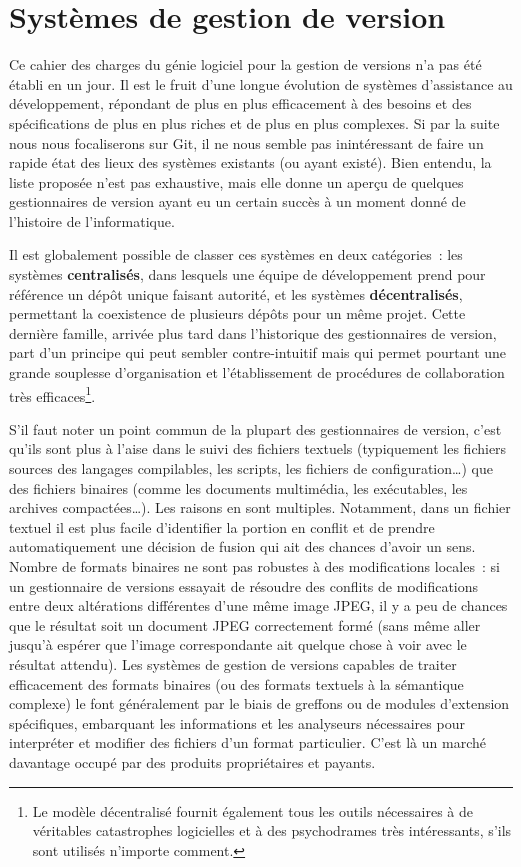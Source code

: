 \section{Systèmes de gestion de version}

Ce cahier des charges du génie logiciel pour la gestion de versions
n'a pas été établi en un jour. Il est le fruit d'une longue évolution
de systèmes d'assistance au développement, répondant de plus en plus
efficacement à des besoins et des spécifications de plus en plus
riches et de plus en plus complexes. Si par la suite nous nous
focaliserons sur Git, il ne nous semble pas inintéressant de faire un
rapide état des lieux des systèmes existants (ou ayant existé). Bien
entendu, la liste proposée n'est pas exhaustive, mais elle donne un
aperçu de quelques gestionnaires de version ayant eu un certain succès
à un moment donné de l'histoire de l'informatique.

Il est globalement possible de classer ces systèmes en deux
catégories~: les systèmes \textbf{centralisés}, dans lesquels une
équipe de développement prend pour référence un dépôt unique faisant
autorité, et les systèmes \textbf{décentralisés}, permettant la
coexistence de plusieurs dépôts pour un même projet. Cette dernière
famille, arrivée plus tard dans l'historique des gestionnaires de
version, part d'un principe qui peut sembler contre-intuitif mais qui
permet pourtant une grande souplesse d'organisation et l'établissement
de procédures de collaboration très efficaces\footnote{Le modèle
  décentralisé fournit également tous les outils nécessaires à de
  véritables catastrophes logicielles et à des psychodrames très
  intéressants, s'ils sont utilisés n'importe comment.}.

S'il faut noter un point commun de la plupart des gestionnaires de
version, c'est qu'ils sont plus à l'aise dans le suivi des fichiers
textuels (typiquement les fichiers sources des langages compilables,
les scripts, les fichiers de configuration\ldots) que des fichiers
binaires (comme les documents multimédia, les exécutables, les
archives compactées\ldots). Les raisons en sont multiples. Notamment,
dans un fichier textuel il est plus facile d'identifier la portion en
conflit et de prendre automatiquement une décision de fusion qui ait
des chances d'avoir un sens. Nombre de formats binaires ne sont pas
robustes à des modifications locales~: si un gestionnaire de versions
essayait de résoudre des conflits de modifications entre deux
altérations différentes d'une même image JPEG, il y a peu de chances
que le résultat soit un document JPEG correctement formé (sans même
aller jusqu'à espérer que l'image correspondante ait quelque chose à
voir avec le résultat attendu). Les systèmes de gestion de versions
capables de traiter efficacement des formats binaires (ou des formats
textuels à la sémantique complexe) le font généralement par le biais
de greffons ou de modules d'extension spécifiques, embarquant les
informations et les analyseurs nécessaires pour interpréter et
modifier des fichiers d'un format particulier. C'est là un marché
davantage occupé par des produits propriétaires et payants.


